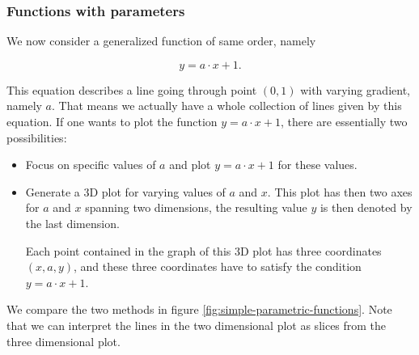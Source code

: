 \documentclass{article}
\begin{document}
\subsubsection{Functions with parameters}

We now consider a generalized function of same order, namely

\begin{equation*}
  y = a \cdot x + 1.
\end{equation*}

This equation describes a line going through point $(0,1)$ with varying gradient, namely $a$. That means we actually have a whole collection of lines given by this equation. If one wants to plot the function $y = a \cdot x + 1$, there are essentially two possibilities:

\begin{itemize}
\item Focus on specific values of $a$ and plot $y = a \cdot x + 1$ for these values.
\item Generate a 3D plot for varying values of $a$ and $x$. This plot has then two axes for $a$ and $x$ spanning two dimensions, the resulting value $y$ is then denoted by the last dimension.

  Each point contained in the graph of this 3D plot has three coordinates $(x,a,y)$, and these three coordinates have to satisfy the condition $y = a \cdot x + 1$.
\end{itemize}

We compare the two methods in figure \ref{fig:simple-parametric-functions}. Note that we can interpret the lines in the two dimensional plot as slices from the three dimensional plot.
\end{document}
